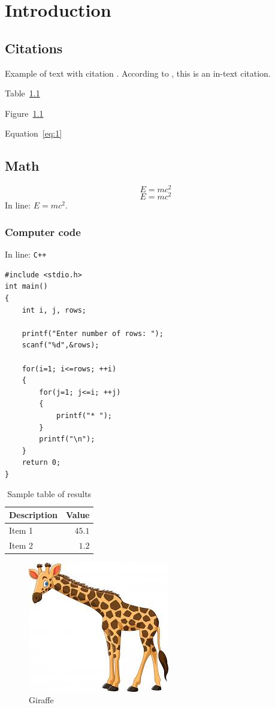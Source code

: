\chapter{Introduction}

\section{Citations}
Example of text with citation \citep{Einstein}. According to \cite{latexcompanion}, this is an in-text citation. 

Table~\ref{tab:results} 

Figure~\ref{fig:giraffe}

Equation~\ref{eq:1}

\section{Math}

\[
E = mc^2
\]
\begin{equation}
E = mc^2
\label{eq:1}
\end{equation}
In line: $E = mc^2$.

\subsection{Computer code}
In line: \texttt{C++}

\begin{verbatim}
#include <stdio.h>
int main()
{
    int i, j, rows;

    printf("Enter number of rows: ");
    scanf("%d",&rows);

    for(i=1; i<=rows; ++i)
    {
        for(j=1; j<=i; ++j)
        {
            printf("* ");
        }
        printf("\n");
    }
    return 0;
}
\end{verbatim}


\begin{table}
	\centering
  \caption{Sample table of results}
  \label{tab:results}
		\begin{tabular}{lr}
      \toprule
      \textbf{Description} & \textbf{Value} \\
      \midrule
      Item 1 & $45.1$ \\
      Item 2 & $1.2$ \\
      \bottomrule
		\end{tabular}
\end{table}

\begin{figure}
	\centering
		\includegraphics{images/giraffe.jpg}
	\caption{Giraffe}
	\label{fig:giraffe}
\end{figure}

